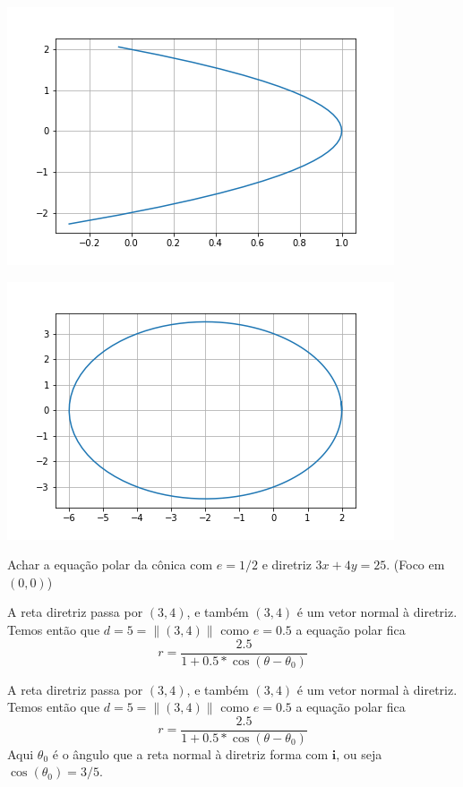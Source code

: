 \documentclass{beamer}
\begin{document}
\begin{frame}
  \includegraphics{coni1.png}
\end{frame}  

\begin{frame}
  \includegraphics{coni2.png}
\end{frame} 


\begin{frame}
  Achar a equação polar da cônica com $e=1/2$ e diretriz $3x+4y=25.$ (Foco em $(0,0)$)
  
\end{frame}

\begin{frame}
  A reta diretriz passa por $(3,4)$, e também $(3,4)$ é um vetor normal à diretriz. Temos então que
  $d=5 =\|(3,4)\|$ como $e=0.5$ a equação polar fica
  $$ r = \frac{2.5}{1+0.5*\cos(\theta-\theta_0)}$$

  
\end{frame}
A reta diretriz passa por $(3,4)$, e também $(3,4)$ é um vetor normal à diretriz. Temos então que
$d=5 =\|(3,4)\|$ como $e=0.5$ a equação polar fica
$$ r = \frac{2.5}{1+0.5*\cos(\theta-\theta_0)}$$
Aqui $\theta_0$ é o ângulo que a reta normal à diretriz forma com $\mathbf{i}$, ou seja 
$\cos(\theta_0)=3/5.$
\end{document}
